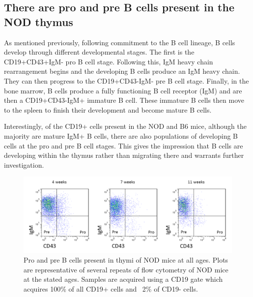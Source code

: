 \subsection{There are pro and pre B cells present in the NOD thymus}


As mentioned previously, following commitment to the B cell lineage, B cells develop through different developmental stages.
The first is the CD19+CD43+IgM- pro B cell stage.
Following this, IgM heavy chain rearrangement begins and the developing B cells produce an IgM heavy chain. 
They can then progress to the CD19+CD43-IgM- pre B cell stage.
Finally, in the bone marrow, B cells produce a fully functioning B cell receptor (IgM) and are then a CD19+CD43-IgM+ immature B cell.
These immature B cells then move to the spleen to finish their development and become mature B cells.

Interestingly, of the CD19+ cells present in the NOD and B6 mice, although the majority are mature IgM+ B cells, there are also populations of developing B cells at the pro and pre B cell stages.
This gives the impression that B cells are developing within the thymus rather than migrating there and warrants further investigation. 

\begin{figure}
	\includegraphics[width=\textwidth]{Figures/NODpropre.png}
	\caption{Pro and pre B cells present in thymi of NOD mice at all ages. Plots are representative of several repeats of flow cytometry of NOD mice at the stated ages. Samples are acquired using a CD19 gate which acquires 100\% of all CD19+ cells and ~2\% of CD19- cells.}
\end{figure}




